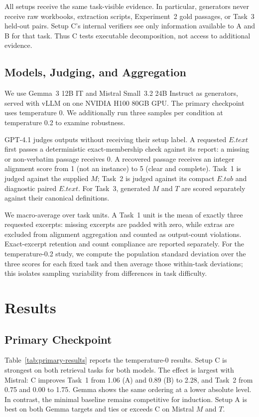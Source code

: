 \documentclass[sigconf,nonacm,anonymous]{acmart}
\begin{document}
All setups receive the same task-visible evidence. In particular, generators never receive raw workbooks, extraction scripts, Experiment~2 gold passages, or Task~3 held-out pairs. Setup C's internal verifiers see only information available to A and B for that task. Thus C tests executable decomposition, not access to additional evidence.

\subsection{Models, Judging, and Aggregation}
We use Gemma~3 12B IT and Mistral Small~3.2 24B Instruct as generators, served with vLLM on one NVIDIA H100 80GB GPU. The primary checkpoint uses temperature 0. We additionally run three samples per condition at temperature 0.2 to examine robustness.

GPT-4.1 judges outputs without receiving their setup label. A requested $E.text$ first passes a deterministic exact-membership check against its report: a missing or non-verbatim passage receives 0. A recovered passage receives an integer alignment score from 1 (not an instance) to 5 (clear and complete). Task~1 is judged against the supplied $M$; Task~2 is judged against its compact $E.tab$ and diagnostic paired $E.text$. For Task~3, generated $M$ and $T$ are scored separately against their canonical definitions.

We macro-average over task units. A Task~1 unit is the mean of exactly three requested excerpts: missing excerpts are padded with zero, while extras are excluded from alignment aggregation and counted as output-count violations. Exact-excerpt retention and count compliance are reported separately. For the temperature-0.2 study, we compute the population standard deviation over the three scores for each fixed task and then average those within-task deviations; this isolates sampling variability from differences in task difficulty.

\section{Results}
\label{sec:results}

\subsection{Primary Checkpoint}
Table~\ref{tab:primary-results} reports the temperature-0 results. Setup C is strongest on both retrieval tasks for both models. The effect is largest with Mistral: C improves Task~1 from 1.06 (A) and 0.89 (B) to 2.28, and Task~2 from 0.75 and 0.00 to 1.75. Gemma shows the same ordering at a lower absolute level. In contrast, the minimal baseline remains competitive for induction. Setup A is best on both Gemma targets and ties or exceeds C on Mistral $M$ and $T$.
\end{document}
